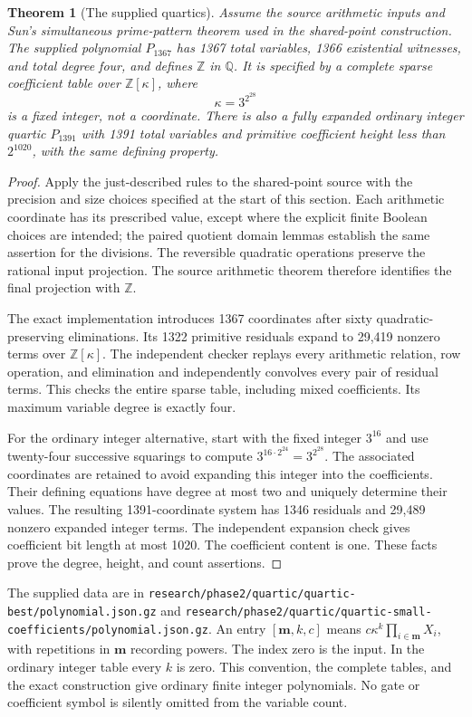 \documentclass[11pt]{article}
\newtheorem{theorem}{Theorem}[section]
\theoremstyle{definition}
\begin{document}
\begin{theorem}[The supplied quartics]\label{thm:quartic-1367}
Assume the source arithmetic inputs and Sun's simultaneous prime-pattern
theorem used in the shared-point construction.  The supplied polynomial
$P_{1367}$ has 1367 total variables, 1366 existential witnesses, and total
degree four, and defines $\mathbb Z$ in $\mathbb Q$.  It is specified by
a complete sparse coefficient table over $\mathbb Z[\kappa]$, where
\[
                         \kappa=3^{2^{28}}
\]
is a fixed integer, not a coordinate.  There is also a fully expanded
ordinary integer quartic $P_{1391}$ with 1391 total variables and primitive
coefficient height less than $2^{1020}$, with the same defining property.
\end{theorem}
\begin{proof}
Apply the just-described rules to the shared-point source with the
precision and size choices specified at the start of this section.
Each arithmetic coordinate has its prescribed value, except where the
explicit finite Boolean choices are intended; the paired quotient domain
lemmas establish the same assertion for the divisions.  The reversible
quadratic operations preserve the rational input projection.  The source
arithmetic theorem therefore identifies the final projection with
$\mathbb Z$.

The exact implementation introduces 1367 coordinates after sixty
quadratic-preserving eliminations.  Its 1322 primitive residuals expand
to 29,419 nonzero terms over $\mathbb Z[\kappa]$.  The independent checker
replays every arithmetic relation, row operation, and elimination and
independently convolves every pair of residual terms.  This checks the
entire sparse table, including mixed coefficients.  Its maximum variable
degree is exactly four.

For the ordinary integer alternative, start with the fixed integer
$3^{16}$ and use twenty-four successive squarings to compute
$3^{16\cdot2^{24}}=3^{2^{28}}$.  The associated coordinates are retained
to avoid expanding this integer into the coefficients.  Their defining
equations have degree at most two and uniquely determine their values.
The resulting 1391-coordinate system has 1346 residuals and 29,489
nonzero expanded integer terms.  The independent expansion check gives
coefficient bit length at most 1020.  The coefficient content is one.
These facts prove the degree, height, and count assertions.
\end{proof}

The supplied data are in
\nolinkurl{research/phase2/quartic/quartic-best/polynomial.json.gz} and
\nolinkurl{research/phase2/quartic/quartic-small-coefficients/polynomial.json.gz}.
An entry $[\mathbf m,k,c]$ means $c\kappa^k\prod_{i\in\mathbf m}X_i$,
with repetitions in $\mathbf m$ recording powers.  The index zero is the
input.  In the ordinary integer table every $k$ is zero.  This convention,
the complete tables, and the exact construction give ordinary finite
integer polynomials.  No gate or coefficient symbol is silently omitted
from the variable count.
\end{document}
